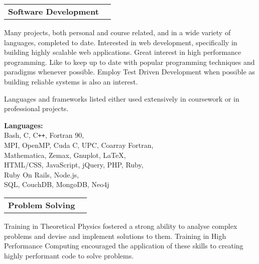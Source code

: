 \documentclass[11pt]{article}
\makeatletter
\newcommand{\resumeSection}[1]{
    \par
    \vspace{\baselineskip}
    \large {\sc {#1}}
    \par
    \vspace{-0.9\baselineskip}
    \hrulefill
    \vspace{0.5\baselineskip}
    \par
}
\newenvironment{resumeSubSectionHeader}{
    \par
    \begin{tabular*}{\textwidth}{l@{\extracolsep{\fill}}r}
    \par
} {
    \end{tabular*}
    \par
}
\newenvironment{resumeSubSectionBody}{
    \par
    \vspace{-0.8\parskip}
    \begin{small}
    \par
} {
    \par
    \end{small}
    \par
}
\makeatother
\begin{document}
\resumeSection{Skills}


\begin{resumeSubSectionHeader}
    \textbf{Software Development}
\end{resumeSubSectionHeader}
\begin{resumeSubSectionBody}
    Many projects, both personal and course related, and in a wide variety
    of languages, completed to date.
    Interested in web development, specifically in building highly
    scalable web applications.
    Great interest in high performance programming.
    Like to keep up to date with popular programming techniques and paradigms
    whenever possible.
    Employ Test Driven Development when possible as building reliable systems
    is also an interest.

    Languages and frameworks listed either used extensively in coursework
    or in professional projects.

    \begin{description}
        \item{\bf Languages:} \\
            Bash, C, C\verb!++!, Fortran 90, \\
            MPI, OpenMP, Cuda C, UPC, Coarray Fortran, \\
            Mathematica, Zemax, Gnuplot, LaTeX, \\
            HTML/CSS, JavaScript, jQuery, PHP, Ruby, \\
            Ruby On Rails, Node.js, \\
            SQL, CouchDB, MongoDB, Neo4j
    \end{description}
\end{resumeSubSectionBody}

\begin{resumeSubSectionHeader}
    \textbf{Problem Solving}
\end{resumeSubSectionHeader}
\begin{resumeSubSectionBody}
    Training in Theoretical Physics fostered a strong ability to
    analyse complex problems and devise and implement solutions to them.
    Training in High Performance Computing encouraged the application
    of these skills to creating highly performant code to solve
    problems.
\end{resumeSubSectionBody}
\end{document}
